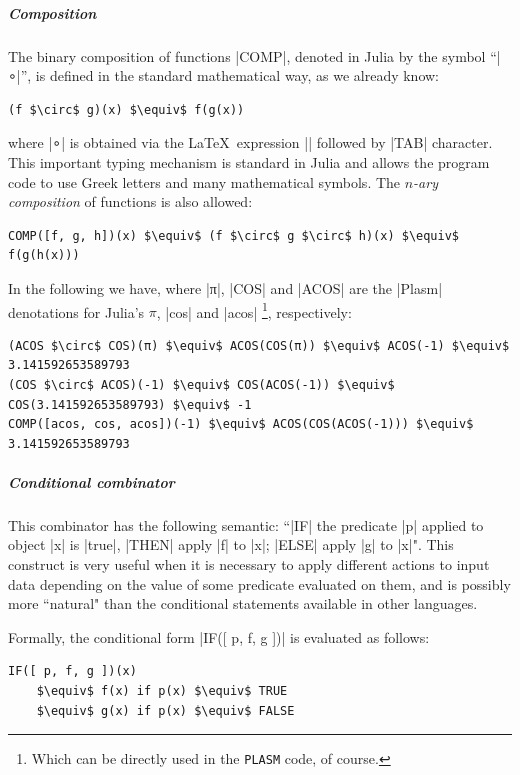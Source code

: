 \subparagraph{Composition}

The binary composition of functions |COMP|, denoted in Julia by the symbol 
``|∘|”, is defined in the standard mathematical way, as we already know:
\begin{lstlisting}[language=JuliaLocal, style=julia, mathescape = true]
(f $\circ$ g)(x) $\equiv$ f(g(x))
\end{lstlisting}
where |∘| is obtained via the \LaTeX\ expression |\circ| followed by |TAB| character. 
This important typing mechanism is standard in Julia and allows the program code to use Greek letters and many mathematical symbols. 
The \emph{$n$-ary composition} of functions is also allowed:
\begin{lstlisting}[language=JuliaLocal, style=julia, mathescape = true]
COMP([f, g, h])(x) $\equiv$ (f $\circ$ g $\circ$ h)(x) $\equiv$ f(g(h(x)))
\end{lstlisting}
In the following we have, where |π|, |COS| and
|ACOS| are the |Plasm| denotations for Julia’s $\pi$, |cos| and
|acos| \footnote{Which can be directly used in the \texttt{PLASM} code, of course.}, respectively:
\begin{lstlisting}[language=JuliaLocal, style=julia, mathescape = true]
(ACOS $\circ$ COS)(π) $\equiv$ ACOS(COS(π)) $\equiv$ ACOS(-1) $\equiv$ 3.141592653589793
(COS $\circ$ ACOS)(-1) $\equiv$ COS(ACOS(-1)) $\equiv$ COS(3.141592653589793) $\equiv$ -1
COMP([acos, cos, acos])(-1) $\equiv$ ACOS(COS(ACOS(-1))) $\equiv$ 3.141592653589793
\end{lstlisting}



\subparagraph{Conditional combinator}

This combinator has the
following semantic: ``|IF| the predicate |p| applied to object 
|x| is |true|, |THEN| apply |f| to
|x|; |ELSE| apply |g| to |x|". 
This construct is very useful when it is necessary to apply different
actions to input data depending on the value of some predicate
evaluated on them, and is possibly more ``natural" than the
conditional statements available in other languages.  

Formally, the conditional form |IF([ p, f, g ])| is evaluated as follows: 
\begin{lstlisting}[language=JuliaLocal, style=julia, mathescape = true]
IF([ p, f, g ])(x) 
	$\equiv$ f(x) if p(x) $\equiv$ TRUE
	$\equiv$ g(x) if p(x) $\equiv$ FALSE
\end{lstlisting}

